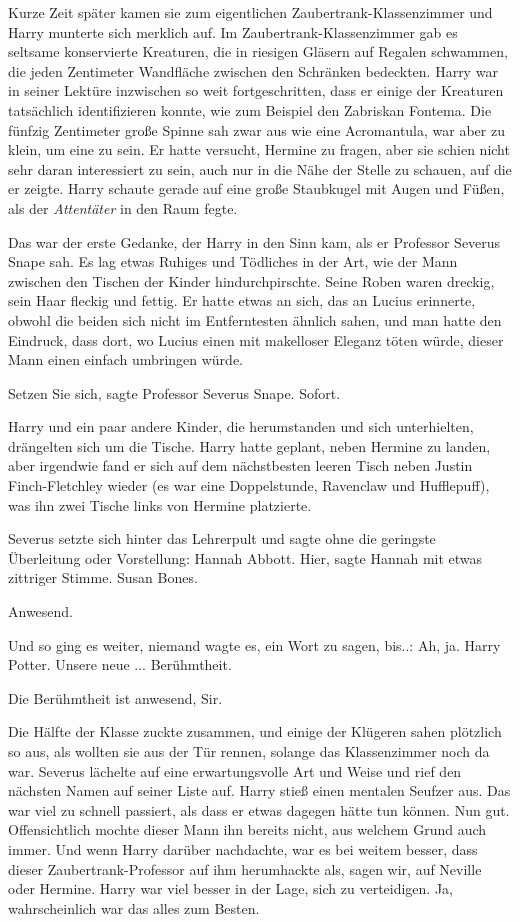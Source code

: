 Kurze Zeit später kamen sie zum eigentlichen Zaubertrank-Klassenzimmer und Harry
munterte sich merklich auf. Im Zaubertrank-Klassenzimmer gab es seltsame
konservierte Kreaturen, die in riesigen Gläsern auf Regalen schwammen, die jeden
Zentimeter Wandfläche zwischen den Schränken bedeckten. Harry war in seiner
Lektüre inzwischen so weit fortgeschritten, dass er einige der Kreaturen
tatsächlich identifizieren konnte, wie zum Beispiel den Zabriskan Fontema. Die
fünfzig Zentimeter große Spinne sah zwar aus wie eine Acromantula, war aber zu
klein, um eine zu sein. Er hatte versucht, Hermine zu fragen, aber sie schien
nicht sehr daran interessiert zu sein, auch nur in die Nähe der Stelle zu
schauen, auf die er zeigte. Harry schaute gerade auf eine große Staubkugel mit
Augen und Füßen, als der \emph{Attentäter} in den Raum fegte.

Das war der erste Gedanke, der Harry in den Sinn kam, als er Professor Severus
Snape sah. Es lag etwas Ruhiges und Tödliches in der Art, wie der Mann zwischen
den Tischen der Kinder hindurchpirschte. Seine Roben waren dreckig, sein Haar
fleckig und fettig. Er hatte etwas an sich, das an Lucius erinnerte, obwohl die
beiden sich nicht im Entferntesten ähnlich sahen, und man hatte den Eindruck,
dass dort, wo Lucius einen mit makelloser Eleganz töten würde, dieser Mann einen
einfach umbringen würde.

\glqq{}Setzen Sie sich\grqq{}, sagte Professor Severus Snape. \glqq{}
Sofort.\grqq{}

Harry und ein paar andere Kinder, die herumstanden und sich unterhielten,
drängelten sich um die Tische. Harry hatte geplant, neben Hermine zu landen,
aber irgendwie fand er sich auf dem nächstbesten leeren Tisch neben Justin
Finch-Fletchley wieder (es war eine Doppelstunde, Ravenclaw und Hufflepuff), was
ihn zwei Tische links von Hermine platzierte.

Severus setzte sich hinter das Lehrerpult und sagte ohne die geringste
Überleitung oder Vorstellung: \glqq{}Hannah Abbott.\grqq{} \glqq{}Hier\grqq{},
sagte Hannah mit etwas zittriger Stimme. \glqq{}Susan Bones.\grqq{}

\glqq{}Anwesend.\grqq{}

Und so ging es weiter, niemand wagte es, ein Wort zu sagen, bis..: \glqq{}Ah, ja.
Harry Potter. Unsere neue ... Berühmtheit.\grqq{}

\glqq{}Die Berühmtheit ist anwesend, Sir.\grqq{}

Die Hälfte der Klasse zuckte zusammen, und einige der Klügeren sahen plötzlich
so aus, als wollten sie aus der Tür rennen, solange das Klassenzimmer noch da
war. Severus lächelte auf eine erwartungsvolle Art und Weise und rief den
nächsten Namen auf seiner Liste auf. Harry stieß einen mentalen Seufzer aus. Das
war viel zu schnell passiert, als dass er etwas dagegen hätte tun können. Nun
gut. Offensichtlich mochte dieser Mann ihn bereits nicht, aus welchem Grund auch
immer. Und wenn Harry darüber nachdachte, war es bei weitem besser, dass dieser
Zaubertrank-Professor auf ihm herumhackte als, sagen wir, auf Neville oder
Hermine. Harry war viel besser in der Lage, sich zu verteidigen. Ja,
wahrscheinlich war das alles zum Besten.

